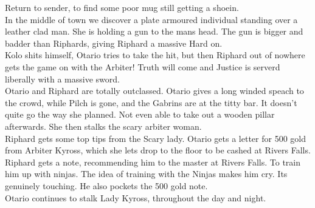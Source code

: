 Return to sender, to find some poor mug still getting a shoein.\\
In the middle of town we discover a plate armoured individual standing over a leather clad man. She is holding a gun to the mans head. The gun is bigger and badder than Riphards, giving Riphard a massive Hard on.\\
Kolo shits himself, Otario tries to take the hit, but then Riphard out of nowhere gets the game on with the Arbiter! Truth will come and Justice is serverd liberally with a massive sword.\\
Otario and Riphard are totally outclassed. Otario gives a long winded speach to the crowd, while Pilch is gone, and the Gabrins are at the titty bar. It doesn’t quite go the way she planned. Not even able to take out a wooden pillar afterwards. She then stalks the scary arbiter woman.\\
Riphard gets some top tips from the Scary lady. Otario gets a letter for 500 gold from Arbiter Kyross, which she lets drop to the floor to be cashed at Rivers Falls.\\
Riphard gets a note, recommending him to the master at Rivers Falls. To train him up with ninjas. The idea of training with the Ninjas makes him cry. Its genuinely touching. He also pockets the 500 gold note.\\
Otario continues to stalk Lady Kyross, throughout the day and night.\\